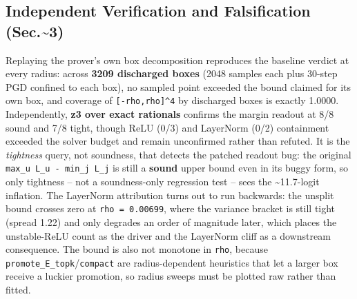 \documentclass[10pt,journal]{IEEEtran}
\begin{document}
\subsection{Independent Verification and Falsification (Sec.\textasciitilde{}3)}
Replaying the prover's own box decomposition reproduces the baseline verdict at every radius: across \textbf{3209 discharged boxes} (2048 samples each plus 30-step PGD confined to each box), no sampled point exceeded the bound claimed for its own box, and coverage of \texttt{[-rho,rho]\textasciicircum{}4} by discharged boxes is exactly 1.0000. 
Independently, \textbf{z3 over exact rationals} confirms the margin readout at 8/8 sound and 7/8 tight, though ReLU (0/3) and LayerNorm (0/2) containment exceeded the solver budget and remain unconfirmed rather than refuted. It is the \emph{tightness} query, not soundness, that detects the patched readout bug: the original \texttt{max\_u L\_u - min\_j L\_j} is still a \textbf{sound} upper bound even in its buggy form, so only tightness -- not a soundness-only regression test -- sees the \textasciitilde{}11.7-logit inflation. 
The LayerNorm attribution turns out to run backwards: the unsplit bound crosses zero at \texttt{rho = 0.00699}, where the variance bracket is still tight (spread 1.22) and only degrades an order of magnitude later, which places the unstable-ReLU count as the driver and the LayerNorm cliff as a downstream consequence. The bound is also not monotone in \texttt{rho}, because \texttt{promote\_E\_topk}/\texttt{compact} are radius-dependent heuristics that let a larger box receive a luckier promotion, so radius sweeps must be plotted raw rather than fitted.
\end{document}
